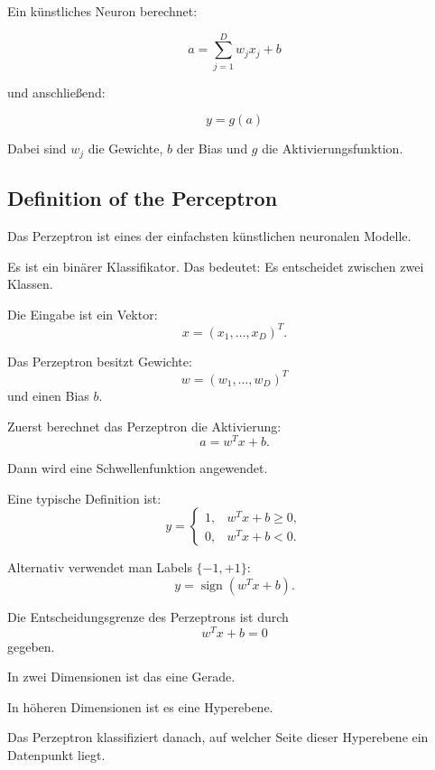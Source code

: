 \documentclass[11pt,a4paper]{scrartcl}
\begin{document}
\begin{answerbox}
    Ein künstliches Neuron berechnet:

    \[
        \boxed{
            a
            =
            \sum_{j=1}^{D} w_j x_j + b
        }
    \]

    und anschließend:

    \[
        \boxed{
            y
            =
            g(a)
        }
    \]

    Dabei sind \(w_j\) die Gewichte, \(b\) der Bias und \(g\) die
    Aktivierungsfunktion.
\end{answerbox}

\subsection{Definition of the Perceptron}

\begin{notebox}
    Das Perzeptron ist eines der einfachsten künstlichen neuronalen Modelle.

    Es ist ein binärer Klassifikator. Das bedeutet: Es entscheidet zwischen zwei
    Klassen.

    Die Eingabe ist ein Vektor:
    \[
        x
        =
        (x_1,\dots,x_D)^T.
    \]

    Das Perzeptron besitzt Gewichte:
    \[
        w
        =
        (w_1,\dots,w_D)^T
    \]
    und einen Bias \(b\).
\end{notebox}

\begin{calculationbox}
    Zuerst berechnet das Perzeptron die Aktivierung:
    \[
        a
        =
        w^T x + b.
    \]

    Dann wird eine Schwellenfunktion angewendet.

    Eine typische Definition ist:
    \[
        y
        =
        \begin{cases}
            1, & w^T x + b \geq 0,\\
            0, & w^T x + b < 0.
        \end{cases}
    \]

    Alternativ verwendet man Labels \(\{-1,+1\}\):
    \[
        y
        =
        \operatorname{sign}(w^T x + b).
    \]
\end{calculationbox}

\begin{solutionbox}
    Die Entscheidungsgrenze des Perzeptrons ist durch
    \[
        w^T x + b = 0
    \]
    gegeben.

    In zwei Dimensionen ist das eine Gerade.

    In höheren Dimensionen ist es eine Hyperebene.

    Das Perzeptron klassifiziert danach, auf welcher Seite dieser Hyperebene ein
    Datenpunkt liegt.
\end{solutionbox}
\end{document}
